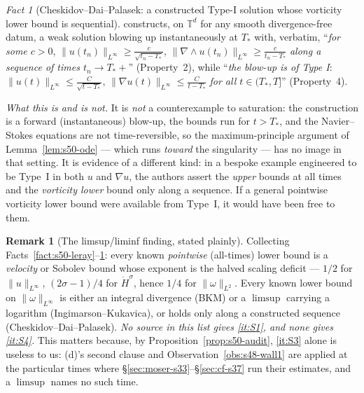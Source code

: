 \documentclass[11pt]{article}
\theoremstyle{definition}
\newtheorem{remark}[theorem]{Remark}
\theoremstyle{remark}
\newtheorem{fact}[theorem]{Fact}
\newcommand{\T}{\mathbb{T}}
\begin{document}
\begin{fact}[Cheskidov--Dai--Palasek: a constructed Type-I solution whose
  vorticity lower bound is sequential]\label{fact:s50-cdp}
  \cite[Thm.~1.1]{CDP2026} constructs, on $\T^d$ for any smooth
  divergence-free datum, a weak solution blowing up instantaneously at $T_*$
  with, verbatim, ``\emph{for some $c>0$},
  $\|u(t_n)\|_{L^\infty}\geq\frac{c}{\sqrt{t_n-T_*}}$,
  $\|\nabla\wedge u(t_n)\|_{L^\infty}\geq\frac{c}{t_n-T_*}$
  \emph{along a sequence of times $t_n\to T_*+$}'' (Property~2), while
  ``\emph{the blow-up is of Type I}:
  $\|u(t)\|_{L^\infty}\leq\frac{C}{\sqrt{t-T_*}}$,
  $\|\nabla u(t)\|_{L^\infty}\leq\frac{C}{t-T_*}$ \emph{for all
  $t\in(T_*,T]$}'' (Property~4).

  \emph{What this is and is not.} It is \emph{not} a counterexample to
  saturation: the construction is a forward (instantaneous) blow-up, the
  bounds run for $t>T_*$, and the Navier--Stokes equations are not
  time-reversible, so the maximum-principle argument of
  Lemma~\ref{lem:s50-ode} --- which runs \emph{toward} the singularity ---
  has no image in that setting. It is evidence of a different kind: in a
  bespoke example engineered to be Type~I in both $u$ and $\nabla u$, the
  authors assert the \emph{upper} bounds at all times and the \emph{vorticity
  lower} bound only along a sequence. If a general pointwise vorticity lower
  bound were available from Type~I, it would have been free to them.
\end{fact}

\begin{remark}[The limsup/liminf finding, stated plainly]
  \label{rem:s50-limsup}
  Collecting Facts~\ref{fact:s50-leray}--\ref{fact:s50-cdp}: every known
  \emph{pointwise} (all-times) lower bound is a \emph{velocity} or Sobolev
  bound whose exponent is the halved scaling deficit --- $1/2$ for
  $\|u\|_{L^\infty}$, $(2\sigma-1)/4$ for $\dot H^\sigma$, hence $1/4$ for
  $\|\omega\|_{L^2}$. Every known lower bound on $\|\omega\|_{L^\infty}$ is
  either an integral divergence (BKM) or a $\limsup$ carrying a logarithm
  (Ingimarson--Kukavica), or holds only along a constructed sequence
  (Cheskidov--Dai--Palasek). \emph{No source in this list gives
  \ref{it:S1}, and none gives \ref{it:S4}.} This matters because, by
  Proposition~\ref{prop:s50-audit}, \ref{it:S3} alone is useless to us: (d)'s
  second clause and Observation~\ref{obs:s48-wall1} are applied at the
  particular times where §\ref{sec:moser-s33}--§\ref{sec:cf-s37} run their
  estimates, and a $\limsup$ names no such time.
\end{remark}
\end{document}
